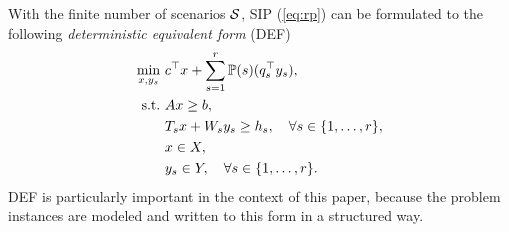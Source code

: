 With the finite number of scenarios $\mathcal{S}$, SIP (\ref{eq:rp}) can be formulated to the following \textit{deterministic equivalent form} (DEF) 
\begin{subequations}\label{sip:ef}
\begin{align}
\min_{x,y_s}\ &c^{\top}x + \sum_{s=1}^{r}\operatorname*{\mathbb{P}}(s) (q_s^{\top}y_s), \label{ef:obj}\\ 
\mathrm{s.t.}\ &Ax\ge b,  \label{ef:b}\\
	&T_s x+W_s y_s\ge h_s,\quad\forall s\in\{1,\ldots,r\}, \label{ef:c} \\
	&x\in X, \label{ef:d} \\
	&y_s \in Y,\quad\forall s\in\{1,\ldots,r\}. \label{ef:e}
\end{align}
\end{subequations}
DEF is particularly important in the context of this paper, because the problem instances are modeled and written to this form in a structured way. 

